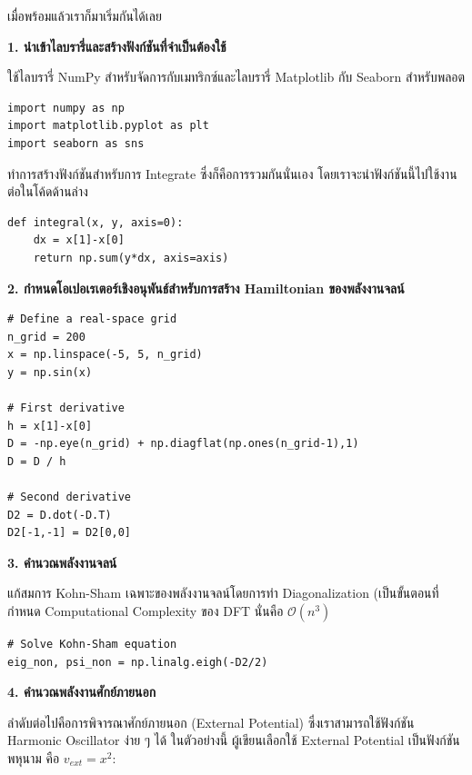 \noindent เมื่อพร้อมแล้วเราก็มาเริ่มกันได้เลย

\noindent \textbf{1. นำเข้าไลบรารี่และสร้างฟังก์ชันที่จำเป็นต้องใช้}

ใช้ไลบรารี่ NumPy สำหรับจัดการกับเมทริกซ์และไลบรารี่ Matplotlib กับ Seaborn สำหรับพลอต
\begin{lstlisting}[style=MyPython]
import numpy as np
import matplotlib.pyplot as plt
import seaborn as sns
\end{lstlisting}

\vspace{1em}
ทำการสร้างฟังก์ชันสำหรับการ Integrate ซึ่งก็คือการรวมกันนั่นเอง โดยเราจะนำฟังก์ชันนี้ไปใช้งานต่อในโค้ดด้านล่าง

\begin{lstlisting}[style=MyPython]
def integral(x, y, axis=0):
    dx = x[1]-x[0]
    return np.sum(y*dx, axis=axis)
\end{lstlisting}

\vspace{1em}
\noindent \textbf{2. กำหนดโอเปอเรเตอร์เชิงอนุพันธ์สำหรับการสร้าง Hamiltonian ของพลังงานจลน์}

\begin{lstlisting}[style=MyPython]
# Define a real-space grid
n_grid = 200
x = np.linspace(-5, 5, n_grid)
y = np.sin(x)

# First derivative
h = x[1]-x[0]
D = -np.eye(n_grid) + np.diagflat(np.ones(n_grid-1),1)
D = D / h

# Second derivative
D2 = D.dot(-D.T)
D2[-1,-1] = D2[0,0]
\end{lstlisting}

\vspace{1em}
\noindent \textbf{3. คำนวณพลังงานจลน์}

แก้สมการ Kohn-Sham เฉพาะของพลังงานจลน์โดยการทำ Diagonalization (เป็นขั้นตอนที่กำหนด Computational Complexity ของ DFT 
นั่นคือ $\mathcal{O}(n^{3})$

\begin{lstlisting}[style=MyPython]
# Solve Kohn-Sham equation
eig_non, psi_non = np.linalg.eigh(-D2/2)
\end{lstlisting}

\vspace{1em}
\noindent \textbf{4. คำนวณพลังงานศักย์ภายนอก}

ลำดับต่อไปคือการพิจารณาศักย์ภายนอก (External Potential) ซึ่งเราสามารถใช้ฟังก์ชัน Harmonic Oscillator ง่าย ๆ ได้ ในตัวอย่างนี้%
ผู้เขียนเลือกใช้ External Potential เป็นฟังก์ชันพหุนาม คือ $v_{ext}=x^2$:

